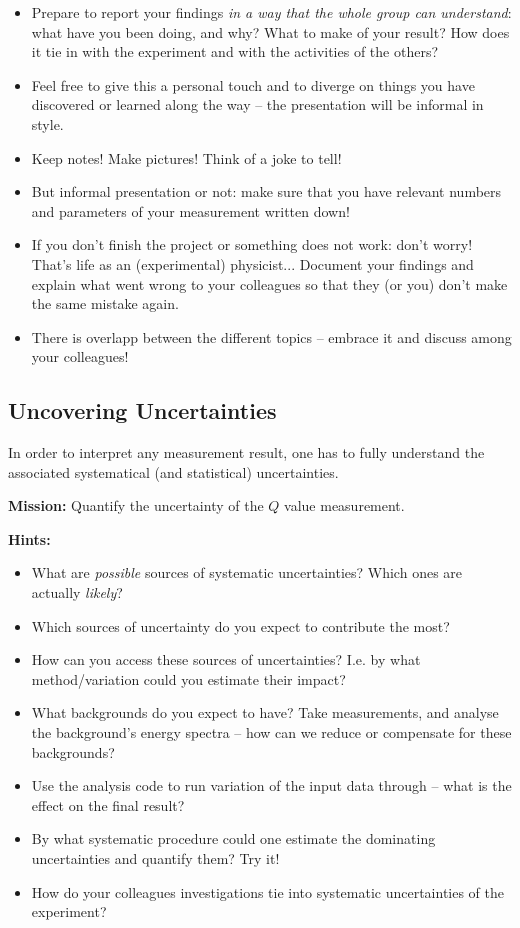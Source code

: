 \documentclass[a4,11pt, notitlepage]{article}
\begin{document}
\begin{itemize}
\item Prepare to report your findings \emph{in a way that the
    whole group can understand}: what have you been doing, and why?
  What to make of your result? How does it tie in with the experiment
  and with the activities of the others?
\item Feel free to give this a personal touch and to diverge on things
  you have discovered or learned along the way -- the presentation
  will be informal in style.
\item Keep notes! Make pictures! Think of a joke to tell!
\item But informal presentation or not: make sure that you have
  relevant numbers and parameters of your measurement written down!
\item If you don't finish the project or something does not work:
  don't worry! That's life as an (experimental) physicist... Document
  your findings and explain what went wrong to your colleagues so that
  they (or you) don't make the same mistake again.
\item There is overlapp between the different topics -- embrace it and
  discuss among your colleagues!
\end{itemize}

\subsection{Uncovering Uncertainties}
\label{sec:uncertainties}

In order to interpret any measurement result, one has to fully
understand the associated systematical (and statistical)
uncertainties.

\noindent\textbf{Mission:} Quantify the uncertainty of the $Q$ value measurement.

\noindent\textbf{Hints:}
\begin{itemize}
\item What are \emph{possible} sources of systematic uncertainties?
  Which ones are actually \emph{likely}?
\item Which sources of uncertainty do you expect to contribute the
  most?
\item How can you access these sources of uncertainties? I.e. by what
  method/variation could you estimate their impact?
\item What backgrounds do you expect to have? Take measurements, and
  analyse the background's energy spectra -- how can we reduce or
  compensate for these backgrounds?
\item Use the analysis code to run variation of the input data through
  -- what is the effect on the final result?
\item By what systematic procedure could one estimate the dominating
  uncertainties and quantify them? Try it!
\item How do your colleagues investigations tie into systematic
  uncertainties of the experiment?
\end{itemize}
\end{document}
